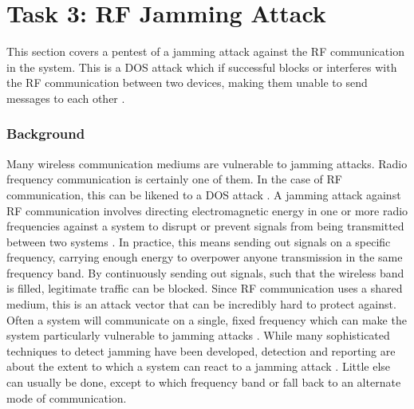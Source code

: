 \section{Task 3: RF Jamming Attack}\label{ch:pentesting:rf-jamming}
This section covers a pentest of a jamming attack against the RF communication in the system. This is a \gls{DOS} attack which if successful blocks or interferes with the RF communication between two devices, making them unable to send messages to each other \cite{hacking-the-iot-talk}.

\subsubsection{Background}
Many wireless communication mediums are vulnerable to jamming attacks. Radio frequency communication is certainly one of them. In the case of RF communication, this can be likened to a \gls{DOS} attack \cite{hacking-the-iot-talk}. A jamming attack against RF communication involves directing electromagnetic energy in one or more radio frequencies against a system to disrupt or prevent signals from being transmitted between two systems \cite{adamy2004ew}. In practice, this means sending out signals on a specific frequency, carrying enough energy to overpower anyone transmission in the same frequency band. By continuously sending out signals, such that the wireless band is filled, legitimate traffic can be blocked. Since RF communication uses a shared medium, this is an attack vector that can be incredibly hard to protect against. Often a system will communicate on a single, fixed frequency which can make the system particularly vulnerable to jamming attacks \cite{jamming-feasibility}. While many sophisticated techniques to detect jamming have been developed, detection and reporting are about the extent to which a system can react to a jamming attack \cite{optimal-jamming-defense}. Little else can usually be done, except to which frequency band or fall back to an alternate mode of communication.

